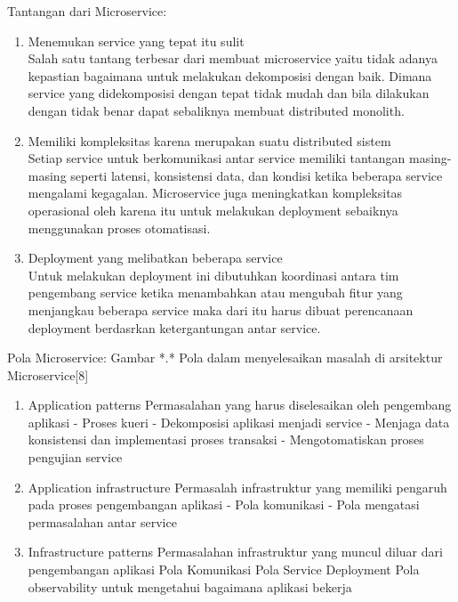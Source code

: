 Tantangan dari Microservice:
\begin{enumerate}[leftmargin=1.3cm]
	\item Menemukan service yang tepat itu sulit\\
	Salah satu tantang terbesar dari membuat microservice yaitu tidak adanya kepastian bagaimana untuk melakukan dekomposisi dengan baik. Dimana service yang didekomposisi dengan tepat tidak mudah dan bila dilakukan dengan tidak benar dapat sebaliknya membuat distributed monolith. 
	\item Memiliki kompleksitas karena merupakan suatu distributed sistem\\
	Setiap service untuk berkomunikasi antar service memiliki tantangan masing-masing seperti latensi, konsistensi data, dan kondisi ketika beberapa service mengalami kegagalan. Microservice juga meningkatkan kompleksitas operasional oleh karena itu untuk melakukan deployment sebaiknya menggunakan proses otomatisasi.
	\item Deployment yang melibatkan beberapa service\\
	Untuk melakukan deployment ini dibutuhkan koordinasi antara tim pengembang service ketika menambahkan atau mengubah fitur yang menjangkau beberapa service maka dari itu harus dibuat perencanaan deployment berdasrkan ketergantungan antar service.
\end{enumerate}	

Pola Microservice:
Gambar *.* Pola dalam menyelesaikan masalah di arsitektur Microservice[8]
\begin{enumerate}[leftmargin=1.3cm]
	\item Application patterns
	Permasalahan yang harus diselesaikan oleh pengembang aplikasi
	- Proses kueri
	- Dekomposisi aplikasi menjadi service
	- Menjaga data konsistensi dan implementasi proses transaksi
	- Mengotomatiskan proses pengujian  service
	\item Application infrastructure 
	Permasalah infrastruktur yang memiliki pengaruh pada proses pengembangan aplikasi
	- Pola komunikasi
	- Pola mengatasi permasalahan antar service
	\item Infrastructure patterns 
	Permasalahan infrastruktur yang muncul diluar dari pengembangan aplikasi
	Pola Komunikasi
	Pola Service Deployment
	Pola observability untuk mengetahui bagaimana aplikasi bekerja	
\end{enumerate}	

